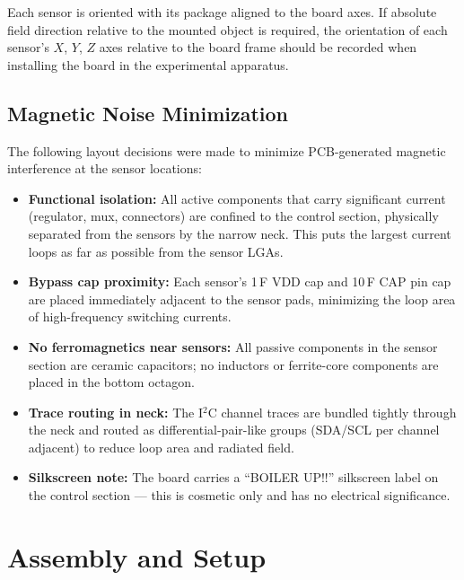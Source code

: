 \documentclass[12pt]{article}
\begin{document}
Each sensor is oriented with its package aligned to the board axes. If
absolute field direction relative to the mounted object is required,
the orientation of each sensor's $X$, $Y$, $Z$ axes relative to the
board frame should be recorded when installing the board in the
experimental apparatus.

\subsection{Magnetic Noise Minimization}

The following layout decisions were made to minimize PCB-generated magnetic
interference at the sensor locations:

\begin{itemize}
  \item \textbf{Functional isolation:} All active components that carry
        significant current (regulator, mux, connectors) are confined to
        the control section, physically separated from the sensors by the
        narrow neck. This puts the largest current loops as far as possible
        from the sensor LGAs.
  \item \textbf{Bypass cap proximity:} Each sensor's 1\,\textmu F VDD cap
        and 10\,\textmu F CAP pin cap are placed immediately adjacent to the
        sensor pads, minimizing the loop area of high-frequency switching
        currents.
  \item \textbf{No ferromagnetics near sensors:} All passive components in
        the sensor section are ceramic capacitors; no inductors or
        ferrite-core components are placed in the bottom octagon.
  \item \textbf{Trace routing in neck:} The I$^2$C channel traces are
        bundled tightly through the neck and routed as differential-pair-like
        groups (SDA/SCL per channel adjacent) to reduce loop area and
        radiated field.
  \item \textbf{Silkscreen note:} The board carries a ``BOILER UP!!''
        silkscreen label on the control section --- this is cosmetic only
        and has no electrical significance.
\end{itemize}

\newpage
\section{Assembly and Setup}
\end{document}
